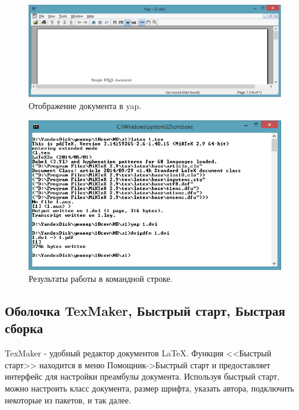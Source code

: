 \documentclass[10pt,a4paper,titlepage]{article}
\begin{document}
\begin{figure}[hbtp]
\centering
\includegraphics[width=1\linewidth]{yap.png}
\caption{Отображение документа в yap.}
\end{figure}

\begin{figure}[hbtp]
\centering
\includegraphics[width=1\linewidth]{CLI.png}
\caption{Результаты работы в командной строке.}
\end{figure}

\subsection{Оболочка TexMaker, Быстрый старт, Быстрая \mbox{сборка}}
TexMaker - удобный редактор документов \LaTeX. Функция <<Быстрый старт>> находится в меню Помощник->Быстрый старт и предоставляет интерфейс для настройки преамбулы документа. Используя быстрый старт, можно настроить класс документа, размер шрифта, указать автора, подключить некоторые из пакетов, и так далее.
\end{document}
